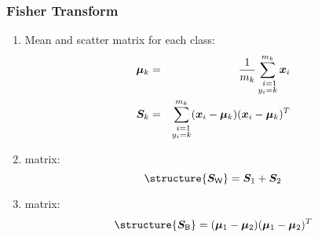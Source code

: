 \begin{frame}
	\frametitle{Fisher Transform \cont}


	\begin{enumerate}
		\item Mean and scatter matrix for each class:
		      {\small
		      \begin{eqnarray*}
			      {\bm \mu}_k &=& \frac{1}{m_k} \sum_{\substack{~i = 1\\ y_i = k}}^{m_k} {\bm x}_i \\
			      {\bm S}_k   &=& \sum_{\substack{~i = 1\\ y_i = k}}^{m_k} ({\bm x}_i - {\bm \mu}_k) ({\bm x}_i - {\bm \mu}_k)^T
		      \end{eqnarray*}
		      }
		\item {} matrix:
		      {\small
		      \begin{displaymath}
			      \structure{\mat{S}_\mathsf{W}} = \mat{S}_1 + \mat{S}_2
		      \end{displaymath}
		      }
		\item {} matrix:
		      {\small
		      \begin{displaymath}
			      \structure{\mat{S}_\mathsf{B}} = (\vec{\mu}_1 - \vec{\mu}_2) (\vec{\mu}_1 - \vec{\mu}_2)^T
		      \end{displaymath}
		      }
	\end{enumerate}
\end{frame}


